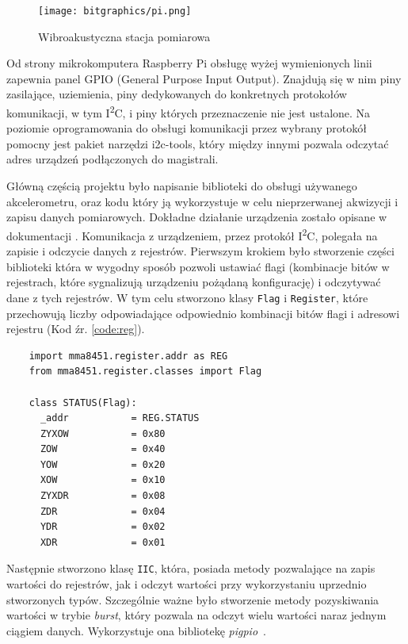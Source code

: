\documentclass[a4paper,12pt]{mwart}
\begin{document}
\begin{figure}[!tbh]
  \centering
  \texttt{[image: bitgraphics/pi.png]}
  \caption{Wibroakustyczna stacja pomiarowa}
  \label{fig:foto}
\end{figure}

Od strony mikrokomputera Raspberry Pi obsługę wyżej wymienionych linii zapewnia
panel GPIO (General Purpose Input Output). Znajdują się w nim piny zasilające,
uziemienia, piny dedykowanych do konkretnych protokołów komunikacji, w tym
I\textsuperscript{2}C, i piny których przeznaczenie nie jest ustalone.  Na
poziomie oprogramowania do obsługi komunikacji przez wybrany protokół pomocny
jest pakiet narzędzi {\fontfamily{\ttdefault}\selectfont i2c-tools}, który
między innymi pozwala odczytać adres urządzeń podłączonych do magistrali.

Główną częścią projektu było napisanie biblioteki do obsługi używanego
akcelerometru, oraz kodu który ją wykorzystuje w celu nieprzerwanej akwizycji i
zapisu danych pomiarowych. Dokładne działanie urządzenia zostało opisane w
dokumentacji \cite{mma8451}. Komunikacja z urządzeniem, przez protokół
I\textsuperscript{2}C, polegała na zapisie i odczycie danych z rejestrów.
Pierwszym krokiem było stworzenie części biblioteki która w wygodny sposób
pozwoli ustawiać flagi (kombinacje bitów w rejestrach, które sygnalizują
urządzeniu pożądaną konfigurację) i odczytywać dane z tych rejestrów. W tym
celu stworzono klasy \lstinline|Flag| i \lstinline|Register|, które
przechowują liczby odpowiadające odpowiednio kombinacji bitów flagi i
adresowi rejestru (Kod źr. \ref{code:reg}).

\begin{program}
  \caption{Definicja rejestru \lstinline|STATUS| i jego flag}
  \begin{lstlisting}
    import mma8451.register.addr as REG
    from mma8451.register.classes import Flag

    class STATUS(Flag):
      _addr           = REG.STATUS
      ZYXOW           = 0x80
      ZOW             = 0x40
      YOW             = 0x20
      XOW             = 0x10
      ZYXDR           = 0x08
      ZDR             = 0x04
      YDR             = 0x02
      XDR             = 0x01
  \end{lstlisting}
  \label{code:reg}
\end{program}

Następnie stworzono klasę \lstinline|IIC|, która, posiada metody pozwalające na
zapis wartości do rejestrów, jak i odczyt wartości przy wykorzystaniu uprzednio
stworzonych typów. Szczególnie ważne było stworzenie metody pozyskiwania
wartości w trybie \emph{burst}, który pozwala na odczyt wielu wartości naraz
jednym ciągiem danych. Wykorzystuje ona bibliotekę \emph{pigpio}~\cite{pigpio}.
\end{document}
